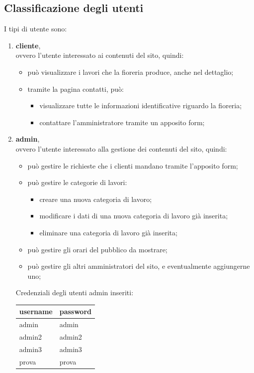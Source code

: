 \subsection{Classificazione degli utenti}
I tipi di utente sono:
\begin{enumerate}
\item \textbf{cliente}, \\ovvero l'utente interessato ai contenuti del sito, quindi:
\begin{itemize}
\item può visualizzare i lavori che la fioreria produce, anche nel dettaglio;
\item tramite la pagina contatti, può: 
\begin{itemize}
\item visualizzare tutte le informazioni identificative riguardo la fioreria;
\item contattare l'amministratore tramite un apposito form;
\end{itemize}  
\end{itemize}  
\item \textbf{admin}, \\ovvero l'utente interessato alla gestione dei contenuti del sito, quindi:
\begin{itemize}
\item può gestire le richieste che i clienti mandano tramite l'apposito form; 
\item può gestire le categorie di lavori:
\begin{itemize}
\item creare una nuova categoria di lavoro;
\item modificare i dati di una nuova categoria di lavoro già inserita;
\item eliminare una categoria di lavoro già inserita;
\end{itemize} 
\item può gestire gli orari del pubblico da mostrare;
\item può gestire gli altri amministratori del sito, e eventualmente aggiungerne uno;
\end{itemize}
Credenziali degli utenti admin inseriti:
\begin{center}
\begin{tabular}{|p{}|p{}|}
\hline
username          & password        \\
\hline
admin           & admin     \\
admin2         & admin2     \\
admin3         & admin3     \\
prova         & prova     \\
\hline
\end{tabular}
\end{center}
\end{enumerate}

